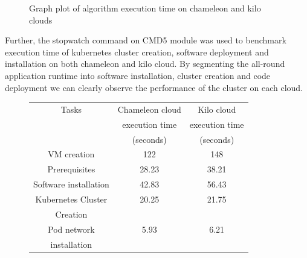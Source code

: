 \documentclass[9pt,twocolumn,twoside]{../../styles/osajnl}
\begin{document}
{\begin{figure}[htbp]
\centering
{}
\caption{Graph plot of algorithm execution time on chameleon and kilo clouds}
\label{Graph plot of algorithm execution time on chameleon and kilo clouds}
\end{figure}

\noindent
Further, the stopwatch command on CMD5 module was used to benchmark
execution time of kubernetes cluster creation, software deployment and
installation on both chameleon and kilo cloud. By segmenting the
all-round application runtime into software installation, cluster
creation and code deployment we can clearly observe the performance of
the cluster on each cloud.


\begin{figure}[ht]
\begin{center}
 \begin{tabular}{|c | c| c|} 
 \hline
 Tasks  & Chameleon cloud & Kilo cloud \\
 & execution time & execution time \\
 & (seconds) & (seconds) \\ [0.5ex] 
 \hline\hline
    
VM creation & 122 & 148 \\
\hline

Prerequisites & 28.23 & 38.21 \\
\hline

Software installation & 42.83  & 56.43 \\[1ex]
\hline

Kubernetes Cluster & 20.25 & 21.75 \\
Creation & & \\[1ex]

\hline
Pod network & 5.93 & 6.21 \\
installation & & \\[1ex]


\end{tabular}
\end{center}
\end{figure}}
\end{document}
